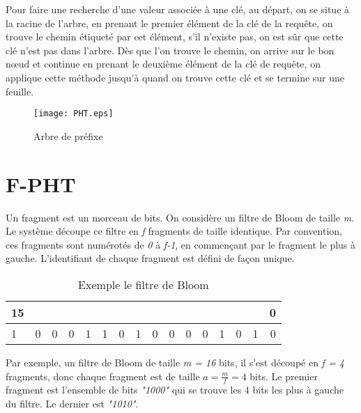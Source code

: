 \documentclass[a4paper,11pt]{report}
\begin{document}
	Pour faire une recherche d'une valeur associée à une clé, au départ, on se situe à la racine de l'arbre, en prenant le premier élément de la clé de la requête, on trouve le chemin étiqueté par cet élément, s'il n'existe pas, on est sûr que cette clé n'est pas dans l'arbre. Dès que l'on trouve le chemin, on arrive sur le bon nœud et continue en prenant le deuxième élément de la clé de requête, on applique cette méthode jusqu'à quand on trouve cette clé et se termine sur une feuille.
	
	\begin{figure}[!htbp]
	\centering
	\texttt{[image: PHT.eps]}
	\caption{Arbre de préfixe}
	\label{PHT}
	\end{figure}	

\newpage	
	
\section{F-PHT}
	Un fragment est un morceau de bits. On considère un filtre de Bloom de taille \textit{m}. Le système découpe ce filtre en \textit{f} fragments de taille identique. Par convention, ces fragments sont numérotés de \textit{0} à \textit{f-1}, en commençant par le fragment le plus à gauche. L'identifiant de chaque fragment est défini de façon unique.
	
	\begin{table}[!h]
		\centering		
		\begin{tabular}{|l|*{14}{c|}r|}
		\multicolumn{1}{c}{{\scriptsize 15}} &\multicolumn{1}{c}{}&\multicolumn{1}{c}{}&\multicolumn{1}{c}{}&
		\multicolumn{1}{c}{}&\multicolumn{1}{c}{}&\multicolumn{1}{c}{}&\multicolumn{1}{c}{}&
		\multicolumn{1}{c}{}&\multicolumn{1}{c}{}&\multicolumn{1}{c}{}&\multicolumn{1}{c}{}&
		\multicolumn{1}{c}{}&\multicolumn{1}{c}{}&\multicolumn{1}{c}{}&\multicolumn{1}{c}{{\scriptsize 0}}\\
		\hline
			1 & 0 & 0 & \multicolumn{1}{c||}{0} & 
			1 & 1 & 0 & \multicolumn{1}{c||}{1} & 
			0 & 0 & 0 & \multicolumn{1}{c||}{0} & 
			1 & 0 & 1 & 0 \\
		\hline
		\end{tabular}
		\caption{Exemple le filtre de Bloom}
		\label{fragment/filtredeBloom}
	\end{table}
	
	Par exemple, un filtre de Bloom de taille \textit{m = 16} bits, il s'est découpé en \textit{f = 4} fragments, donc chaque fragment est de taille $a = \frac{m}{f} = 4$ bits. Le premier fragment est l'ensemble de bits \textit{"1000"} qui se trouve les 4 bits les plus à gauche du filtre. Le dernier est \textit{"1010"}.
\end{document}
